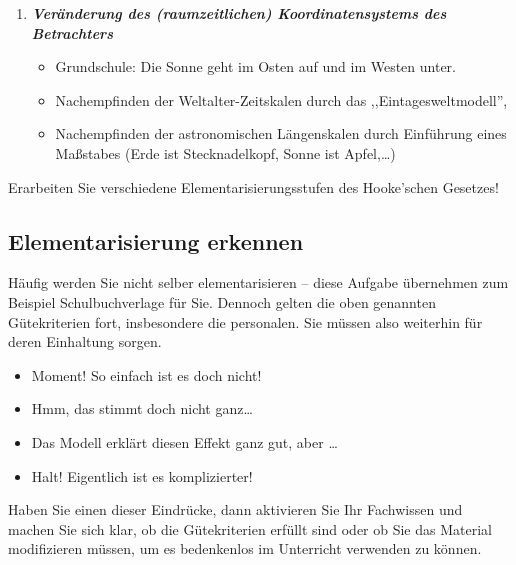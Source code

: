 \begin{enumerate}
	\item \textbf{ \it Ver\"{a}nderung des (raumzeitlichen) Koordinatensystems des
	Betrachters}
	\begin{beisp}
	\begin{itemize}
		\item Grundschule: Die Sonne geht im Osten auf und im Westen unter.
		\item Nachempfinden der Weltalter-Zeitskalen durch das ,,Eintagesweltmodell'',
		\item Nachempfinden der astronomischen L\"{a}ngenskalen durch Einf\"{u}hrung eines
		Ma{\ss}stabes (Erde ist Stecknadelkopf, Sonne ist Apfel,\dots)
	\end{itemize}
	\end{beisp}
	
\end{enumerate}

\begin{uea}
	Erarbeiten Sie verschiedene Elementarisierungsstufen des Hooke'schen Gesetzes!
\end{uea}

\subsection{Elementarisierung erkennen}
Häufig werden Sie nicht selber elementarisieren -- diese Aufgabe übernehmen zum Beispiel Schulbuchverlage für Sie. Dennoch gelten die oben genannten Gütekriterien fort, insbesondere die personalen. Sie müssen also weiterhin für deren Einhaltung sorgen. \begin{itemize}
	\item Moment! So einfach ist es doch nicht!
	\item Hmm, das stimmt doch nicht ganz\dots
	\item Das Modell erklärt diesen Effekt ganz gut, aber \dots
	\item Halt! Eigentlich ist es komplizierter!
\end{itemize}
Haben Sie einen dieser Eindrücke, dann aktivieren Sie Ihr Fachwissen und machen Sie sich klar, ob die Gütekriterien erfüllt sind oder ob Sie das Material modifizieren müssen, um es bedenkenlos im Unterricht verwenden zu können.


